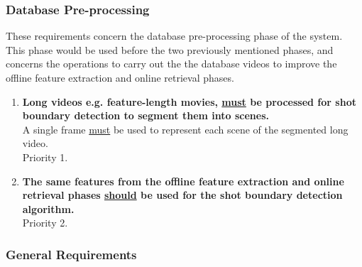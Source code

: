 \subsubsection{Database Pre-processing}

These requirements concern the database pre-processing phase of the system. This phase would be used before the two previously mentioned phases, and concerns the operations to carry out the the database videos to improve the offline feature extraction and online retrieval phases.

\begin{enumerate}

    \item \textbf{Long videos e.g. feature-length movies, \underline{must} be processed for shot boundary detection to segment them into scenes.}\\
    A single frame \underline{must} be used to represent each scene of the segmented long video.\\
    Priority 1.
    
    \item \textbf{The same features from the offline feature extraction and online retrieval phases \underline{should} be used for the shot boundary detection algorithm.}\\
    Priority 2.
    
\end{enumerate}

\subsubsection{General Requirements}

